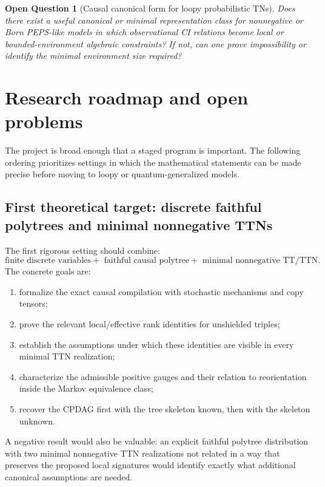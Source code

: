 \documentclass[11pt]{article}
\newtheorem{question}[definition]{Open Question}
\theoremstyle{remark}
\begin{document}
\begin{question}[Causal canonical form for loopy probabilistic TNs]
Does there exist a useful canonical or minimal representation class for nonnegative or Born PEPS-like models in which observational CI relations become local or bounded-environment algebraic constraints? If not, can one prove impossibility or identify the minimal environment size required?
\end{question}

\section{Research roadmap and open problems}
\label{sec:roadmap}

The project is broad enough that a staged program is important. The following ordering prioritizes settings in which the mathematical statements can be made precise before moving to loopy or quantum-generalized models.

\subsection{First theoretical target: discrete faithful polytrees and minimal nonnegative TTNs}

The first rigorous setting should combine:
\begin{equation}
\boxed{
\text{finite discrete variables}
+\text{ faithful causal polytree}
+\text{ minimal nonnegative TT/TTN}.}
\end{equation}
The concrete goals are:
\begin{enumerate}
\item formalize the exact causal compilation with stochastic mechanisms and copy tensors;
\item prove the relevant local/effective rank identities for unshielded triples;
\item establish the assumptions under which these identities are visible in every minimal TTN realization;
\item characterize the admissible positive gauges and their relation to reorientation inside the Markov equivalence class;
\item recover the CPDAG first with the tree skeleton known, then with the skeleton unknown.
\end{enumerate}
A negative result would also be valuable: an explicit faithful polytree distribution with two minimal nonnegative TTN realizations not related in a way that preserves the proposed local signatures would identify exactly what additional canonical assumptions are needed.
\end{document}
